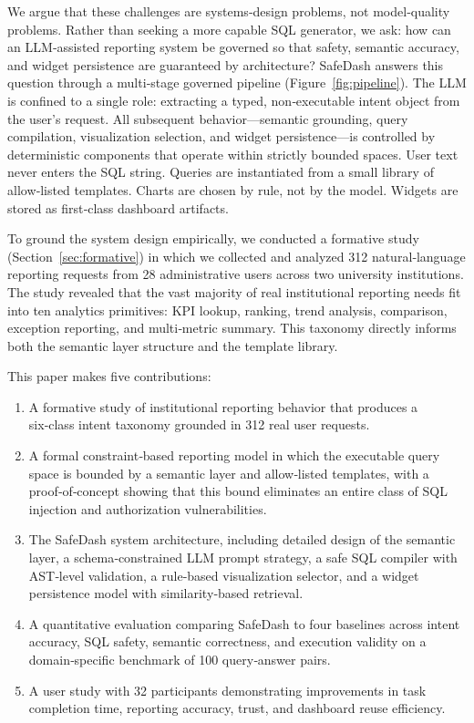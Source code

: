\documentclass[11pt]{article}
\begin{document}
We argue that these challenges are systems‑design problems, not model‑quality problems. Rather than seeking a more capable SQL generator, we ask: how can an LLM‑assisted reporting system be governed so that safety, semantic accuracy, and widget persistence are guaranteed by architecture? SafeDash answers this question through a multi‑stage governed pipeline (Figure~\ref{fig:pipeline}). The LLM is confined to a single role: extracting a typed, non‑executable intent object from the user's request. All subsequent behavior—semantic grounding, query compilation, visualization selection, and widget persistence—is controlled by deterministic components that operate within strictly bounded spaces. User text never enters the SQL string. Queries are instantiated from a small library of allow‑listed templates. Charts are chosen by rule, not by the model. Widgets are stored as first‑class dashboard artifacts.

To ground the system design empirically, we conducted a formative study (Section~\ref{sec:formative}) in which we collected and analyzed 312 natural‑language reporting requests from 28 administrative users across two university institutions. The study revealed that the vast majority of real institutional reporting needs fit into ten analytics primitives: KPI lookup, ranking, trend analysis, comparison, exception reporting, and multi‑metric summary. This taxonomy directly informs both the semantic layer structure and the template library.

This paper makes five contributions:
\begin{enumerate}
  \item A formative study of institutional reporting behavior that produces a six‑class intent taxonomy grounded in 312 real user requests.
  \item A formal constraint‑based reporting model in which the executable query space is bounded by a semantic layer and allow‑listed templates, with a proof‑of‑concept showing that this bound eliminates an entire class of SQL injection and authorization vulnerabilities.
  \item The SafeDash system architecture, including detailed design of the semantic layer, a schema‑constrained LLM prompt strategy, a safe SQL compiler with AST‑level validation, a rule‑based visualization selector, and a widget persistence model with similarity‑based retrieval.
  \item A quantitative evaluation comparing SafeDash to four baselines across intent accuracy, SQL safety, semantic correctness, and execution validity on a domain‑specific benchmark of 100 query‑answer pairs.
  \item A user study with 32 participants demonstrating improvements in task completion time, reporting accuracy, trust, and dashboard reuse efficiency.
\end{enumerate}
\end{document}
